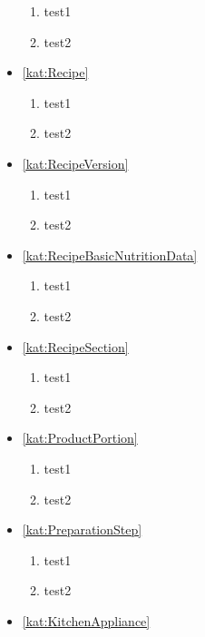 \begin{itemize}[label={\textbf{Ograniczenia dla}}, wide, labelwidth=!, labelindent=0pt]
\begin{enumerate}[label={\textbf{OGR/\protect\threedigits{\arabic{enumi}}}}, wide, labelwidth=!, resume]
        \item test1
        \item test2
    \end{enumerate}
    \item\ref{kat:Recipe}
    \begin{enumerate}[label={\textbf{OGR/\protect\threedigits{\arabic{enumi}}}}, wide, labelwidth=!, resume]
        \item test1
        \item test2
    \end{enumerate}
    \item\ref{kat:RecipeVersion}
    \begin{enumerate}[label={\textbf{OGR/\protect\threedigits{\arabic{enumi}}}}, wide, labelwidth=!, resume]
        \item test1
        \item test2
    \end{enumerate}
    \item\ref{kat:RecipeBasicNutritionData}
    \begin{enumerate}[label={\textbf{OGR/\protect\threedigits{\arabic{enumi}}}}, wide, labelwidth=!, resume]
        \item test1
        \item test2
    \end{enumerate}
    \item\ref{kat:RecipeSection}
    \begin{enumerate}[label={\textbf{OGR/\protect\threedigits{\arabic{enumi}}}}, wide, labelwidth=!, resume]
        \item test1
        \item test2
    \end{enumerate}
    \item\ref{kat:ProductPortion}
    \begin{enumerate}[label={\textbf{OGR/\protect\threedigits{\arabic{enumi}}}}, wide, labelwidth=!, resume]
        \item test1
        \item test2
    \end{enumerate}
    \item\ref{kat:PreparationStep}
    \begin{enumerate}[label={\textbf{OGR/\protect\threedigits{\arabic{enumi}}}}, wide, labelwidth=!, resume]
        \item test1
        \item test2
    \end{enumerate}
    \item\ref{kat:KitchenAppliance}

\end{itemize}
